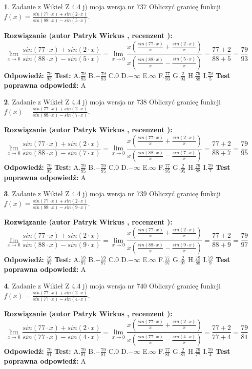 \documentclass[12pt, a4paper]{article}
\theoremstyle{definition} %
\newtheorem{zad}{}
\newcommand{\zadStart}[1]{\begin{zad}#1\newline}
\newcommand{\zadStop}{\end{zad}}
\newcommand{\rozwStart}[2]{\noindent \textbf{Rozwiązanie (autor #1 , recenzent #2): }\newline}
\newcommand{\rozwStop}{\newline}
\newcommand{\odpStart}{\noindent \textbf{Odpowiedź:}\newline}
\newcommand{\odpStop}{\newline}
\newcommand{\testStart}{\noindent \textbf{Test:}\newline}
\newcommand{\testStop}{\newline}
\newcommand{\kluczStart}{\noindent \textbf{Test poprawna odpowiedź:}\newline}
\newcommand{\kluczStop}{\newline}
\begin{document}
\zadStart{Zadanie z Wikieł Z 4.4 j) moja wersja nr 737}
Obliczyć granicę funkcji $f(x)=\frac{sin(77\cdot x) +sin(2\cdot x)}{sin(88\cdot x) -sin(5\cdot x)}$.
\zadStop
\rozwStart{Patryk Wirkus}{}
$$\lim\limits_{x\to 0}\frac{sin(77\cdot x) +sin(2\cdot x)}{sin(88\cdot x) -sin(5\cdot x)}=\lim\limits_{x\to 0}\frac{x(\frac{sin(77\cdot x)}{x}+\frac{sin(2\cdot x)}{x})}{x(\frac{sin(88\cdot x)}{x}-\frac{sin(5\cdot x)}{x})}=\frac{77+2}{88+5} = \frac{79}{93}$$
\rozwStop
\odpStart
$\frac{79}{93}$
\odpStop
\testStart
A.$\frac{79}{93}$
B.$-\frac{79}{93}$
C.$0$
D.$-\infty$
E.$\infty$
F.$\frac{77}{93}$
G.$\frac{2}{93}$
H.$\frac{79}{88}$
I.$\frac{79}{5}$
\testStop
\kluczStart
A
\kluczStop



\zadStart{Zadanie z Wikieł Z 4.4 j) moja wersja nr 738}
Obliczyć granicę funkcji $f(x)=\frac{sin(77\cdot x) +sin(2\cdot x)}{sin(88\cdot x) -sin(7\cdot x)}$.
\zadStop
\rozwStart{Patryk Wirkus}{}
$$\lim\limits_{x\to 0}\frac{sin(77\cdot x) +sin(2\cdot x)}{sin(88\cdot x) -sin(7\cdot x)}=\lim\limits_{x\to 0}\frac{x(\frac{sin(77\cdot x)}{x}+\frac{sin(2\cdot x)}{x})}{x(\frac{sin(88\cdot x)}{x}-\frac{sin(7\cdot x)}{x})}=\frac{77+2}{88+7} = \frac{79}{95}$$
\rozwStop
\odpStart
$\frac{79}{95}$
\odpStop
\testStart
A.$\frac{79}{95}$
B.$-\frac{79}{95}$
C.$0$
D.$-\infty$
E.$\infty$
F.$\frac{77}{95}$
G.$\frac{2}{95}$
H.$\frac{79}{88}$
I.$\frac{79}{7}$
\testStop
\kluczStart
A
\kluczStop



\zadStart{Zadanie z Wikieł Z 4.4 j) moja wersja nr 739}
Obliczyć granicę funkcji $f(x)=\frac{sin(77\cdot x) +sin(2\cdot x)}{sin(88\cdot x) -sin(9\cdot x)}$.
\zadStop
\rozwStart{Patryk Wirkus}{}
$$\lim\limits_{x\to 0}\frac{sin(77\cdot x) +sin(2\cdot x)}{sin(88\cdot x) -sin(9\cdot x)}=\lim\limits_{x\to 0}\frac{x(\frac{sin(77\cdot x)}{x}+\frac{sin(2\cdot x)}{x})}{x(\frac{sin(88\cdot x)}{x}-\frac{sin(9\cdot x)}{x})}=\frac{77+2}{88+9} = \frac{79}{97}$$
\rozwStop
\odpStart
$\frac{79}{97}$
\odpStop
\testStart
A.$\frac{79}{97}$
B.$-\frac{79}{97}$
C.$0$
D.$-\infty$
E.$\infty$
F.$\frac{77}{97}$
G.$\frac{2}{97}$
H.$\frac{79}{88}$
I.$\frac{79}{9}$
\testStop
\kluczStart
A
\kluczStop



\zadStart{Zadanie z Wikieł Z 4.4 j) moja wersja nr 740}
Obliczyć granicę funkcji $f(x)=\frac{sin(77\cdot x) +sin(2\cdot x)}{sin(77\cdot x) -sin(4\cdot x)}$.
\zadStop
\rozwStart{Patryk Wirkus}{}
$$\lim\limits_{x\to 0}\frac{sin(77\cdot x) +sin(2\cdot x)}{sin(77\cdot x) -sin(4\cdot x)}=\lim\limits_{x\to 0}\frac{x(\frac{sin(77\cdot x)}{x}+\frac{sin(2\cdot x)}{x})}{x(\frac{sin(77\cdot x)}{x}-\frac{sin(4\cdot x)}{x})}=\frac{77+2}{77+4} = \frac{79}{81}$$
\rozwStop
\odpStart
$\frac{79}{81}$
\odpStop
\testStart
A.$\frac{79}{81}$
B.$-\frac{79}{81}$
C.$0$
D.$-\infty$
E.$\infty$
F.$\frac{77}{81}$
G.$\frac{2}{81}$
H.$\frac{79}{77}$
I.$\frac{79}{4}$
\testStop
\kluczStart
A
\kluczStop
\end{document}

